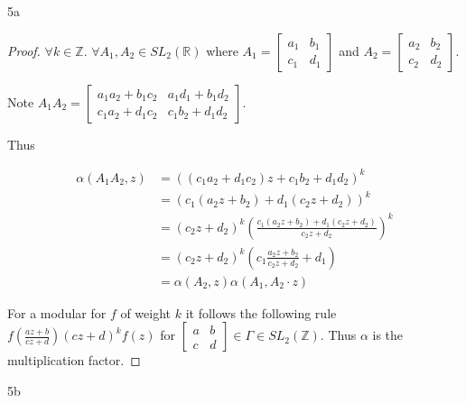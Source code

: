 \documentclass{article}
\newcommand{\R}{\mathbb{R}}
\newcommand{\Z}{\mathbb{Z}}
\begin{document}
\bigskip

\begin{PROB}{5a}\label{Problem 5a.}
\end{PROB}
\begin{proof}
    $\forall k \in \Z$. $\forall A_1, A_2 \in SL_2(\R)$ where $A_1 = \begin{bmatrix}
        a_1 & b_1 \\ c_1 & d_1
    \end{bmatrix}$ and $A_2 = \begin{bmatrix}
        a_2 & b_2 \\ c_2 & d_2
    \end{bmatrix}$. 
    
    Note $A_1 A_2 = \begin{bmatrix}
    a_1 a_2 +b_1 c_2 & a_1d_1 + b_1 d_2 \\
    c_1 a_2 + d_1 c_2 & c_1 b_2 + d_1 d_2
    \end{bmatrix}$. 

    Thus 
    
    \begin{align*}
        \alpha(A_1 A_2, z) &= ((c_1 a_2 + d_1 c_2)z + c_1 b_2 + d_1 d_2)^k \\
        &= (c_1(a_2 z + b_2) + d_1(c_2z + d_2))^k \\
        &= (c_2z + d_2)^k(\frac{c_1(a_2 z + b_2) + d_1(c_2z + d_2)}{c_2 z + d_2})^k \\
        &= (c_2z + d_2)^k \left(c_1\frac{a_2 z + b_2}{c_2 z + d_2} + d_1\right) \\
        &= \alpha(A_2, z) \alpha(A_1, A_2 \cdot z)
    \end{align*}


    For a modular for $f$ of weight $k$ it follows the following rule $f(\frac{az + b}{cz +d}) (cz + d)^k f(z)$ for $\begin{bmatrix}
        a & b \\ c & d
    \end{bmatrix} \in \Gamma \in SL_2(\Z)$. Thus $\alpha$ is the multiplication factor.     
\end{proof}
\begin{PROB}{5b}\label{Problem 5b.}
\end{PROB}
\end{document}
